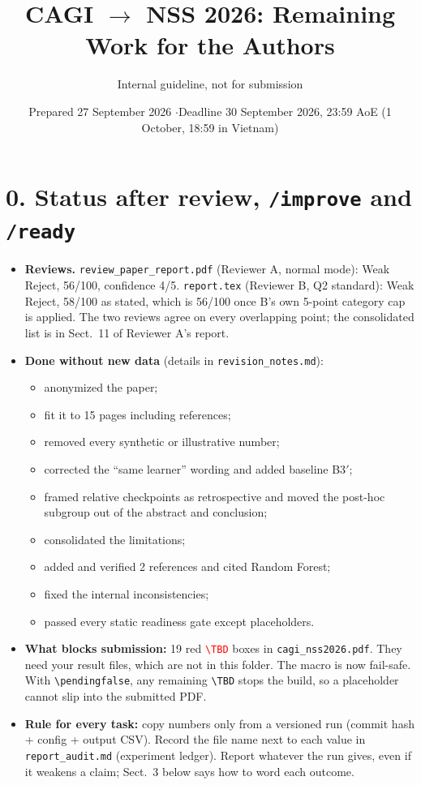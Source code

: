 \documentclass[11pt,a4paper]{article}
\title{CAGI $\rightarrow$ NSS 2026: Remaining Work for the Authors}
\author{Internal guideline, not for submission}
\date{Prepared 27 September 2026 \quad$\cdot$\quad Deadline 30 September 2026, 23:59 AoE (1 October, 18:59 in Vietnam)}
\newcommand{\tbd}{\textcolor{red}{\texttt{\textbackslash TBD}}}
\begin{document}
\maketitle

\section*{0. Status after review, \texttt{/improve} and \texttt{/ready}}
\begin{itemize}[leftmargin=*]
\item \textbf{Reviews.} \texttt{review\_paper\_report.pdf} (Reviewer A, normal mode): Weak Reject, 56/100, confidence 4/5. \texttt{report.tex} (Reviewer B, Q2 standard): Weak Reject, 58/100 as stated, which is 56/100 once B's own 5-point category cap is applied. The two reviews agree on every overlapping point; the consolidated list is in Sect.~11 of Reviewer A's report.
\item \textbf{Done without new data} (details in \texttt{revision\_notes.md}):
  \begin{itemize}
  \item anonymized the paper;
  \item fit it to 15 pages including references;
  \item removed every synthetic or illustrative number;
  \item corrected the ``same learner'' wording and added baseline B3$'$;
  \item framed relative checkpoints as retrospective and moved the post-hoc subgroup out of the abstract and conclusion;
  \item consolidated the limitations;
  \item added and verified 2 references and cited Random Forest;
  \item fixed the internal inconsistencies;
  \item passed every static readiness gate except placeholders.
  \end{itemize}
\item \textbf{What blocks submission:} 19 red \tbd{} boxes in \texttt{cagi\_nss2026.pdf}. They need your result files, which are not in this folder. The macro is now fail-safe. With \verb|\pendingfalse|, any remaining \verb|\TBD| stops the build, so a placeholder cannot slip into the submitted PDF.
\item \textbf{Rule for every task:} copy numbers only from a versioned run (commit hash + config + output CSV). Record the file name next to each value in \texttt{report\_audit.md} (experiment ledger). Report whatever the run gives, even if it weakens a claim; Sect.~3 below says how to word each outcome.
\end{itemize}
\end{document}
